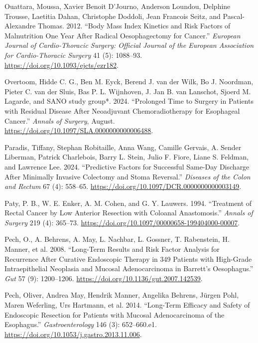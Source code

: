 \documentclass[
  letterpaper,
]{scrbook}
\newlength{\cslhangindent}
\newenvironment{CSLReferences}[2] %
 {\begin{list}{}{%
  \setlength{\itemindent}{0pt}
  \setlength{\leftmargin}{0pt}
  \setlength{\parsep}{0pt}
  \ifodd #1
   \setlength{\leftmargin}{\cslhangindent}
   \setlength{\itemindent}{-1\cslhangindent}
  \fi
  \setlength{\itemsep}{#2\baselineskip}}}
 {\end{list}}
\begin{document}
\begin{CSLReferences}{1}{0}
Ouattara, Moussa, Xavier Benoit D'Journo, Anderson Loundou, Delphine
Trousse, Laetitia Dahan, Christophe Doddoli, Jean Francois Seitz, and
Pascal-Alexandre Thomas. 2012. {``Body Mass Index Kinetics and Risk
Factors of Malnutrition One Year After Radical Oesophagectomy for
Cancer.''} \emph{European Journal of Cardio-Thoracic Surgery: Official
Journal of the European Association for Cardio-Thoracic Surgery} 41 (5):
1088--93. \url{https://doi.org/10.1093/ejcts/ezr182}.

Overtoom, Hidde C. G., Ben M. Eyck, Berend J. van der Wilk, Bo J.
Noordman, Pieter C. van der Sluis, Bas P. L. Wijnhoven, J. Jan B. van
Lanschot, Sjoerd M. Lagarde, and SANO study group*. 2024. {``Prolonged
{Time} to {Surgery} in {Patients} with {Residual} {Disease} {After}
{Neoadjuvant} {Chemoradiotherapy} for {Esophageal} {Cancer}.''}
\emph{Annals of Surgery}, August.
\url{https://doi.org/10.1097/SLA.0000000000006488}.

Paradis, Tiffany, Stephan Robitaille, Anna Wang, Camille Gervais, A.
Sender Liberman, Patrick Charlebois, Barry L. Stein, Julio F. Fiore,
Liane S. Feldman, and Lawrence Lee. 2024. {``Predictive {Factors} for
{Successful} {Same}-{Day} {Discharge} {After} {Minimally} {Invasive}
{Colectomy} and {Stoma} {Reversal}.''} \emph{Diseases of the Colon and
Rectum} 67 (4): 558--65.
\url{https://doi.org/10.1097/DCR.0000000000003149}.

Paty, P. B., W. E. Enker, A. M. Cohen, and G. Y. Lauwers. 1994.
{``Treatment of Rectal Cancer by Low Anterior Resection with Coloanal
Anastomosis.''} \emph{Annals of Surgery} 219 (4): 365--73.
\url{https://doi.org/10.1097/00000658-199404000-00007}.

Pech, O., A. Behrens, A. May, L. Nachbar, L. Gossner, T. Rabenstein, H.
Manner, et al. 2008. {``Long-Term Results and Risk Factor Analysis for
Recurrence After Curative Endoscopic Therapy in 349 Patients with
High-Grade Intraepithelial Neoplasia and Mucosal Adenocarcinoma in
{Barrett}'s Oesophagus.''} \emph{Gut} 57 (9): 1200--1206.
\url{https://doi.org/10.1136/gut.2007.142539}.

Pech, Oliver, Andrea May, Hendrik Manner, Angelika Behrens, Jürgen Pohl,
Maren Weferling, Urs Hartmann, et al. 2014. {``Long-Term Efficacy and
Safety of Endoscopic Resection for Patients with Mucosal Adenocarcinoma
of the Esophagus.''} \emph{Gastroenterology} 146 (3): 652--660.e1.
\url{https://doi.org/10.1053/j.gastro.2013.11.006}.


\end{CSLReferences}
\end{document}
